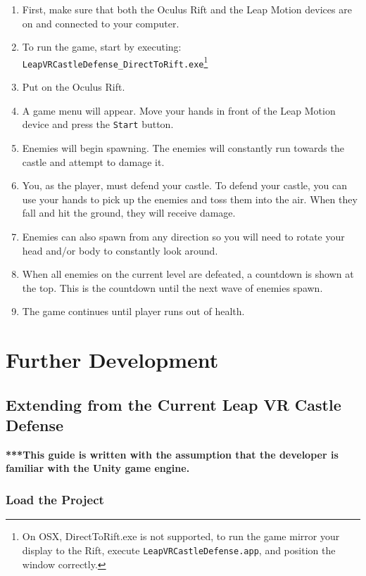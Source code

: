 \documentclass[a4paper]{refart}
\begin{document}
\begin{enumerate}
	\item First, make sure that both the Oculus Rift and the Leap Motion devices are on and connected to your computer.
	\item To run the game, start by executing:\\
		 \texttt{LeapVRCastleDefense\_DirectToRift.exe}\footnote{On OSX, DirectToRift.exe is not supported, to run the game mirror your display to the Rift, execute \texttt{LeapVRCastleDefense.app}, and position the window correctly.}
	\item Put on the Oculus Rift.
	\item A game menu will appear. Move your hands in front of the Leap Motion device and press the \texttt{Start} button.
	\item Enemies will begin spawning. The enemies will constantly run towards the castle and attempt to damage it. 
	\item You, as the player, must defend your castle. To defend your castle, you can use your hands to pick up the enemies and toss them into the air. When they fall and hit the ground, they will receive damage. 
	\item Enemies can also spawn from any direction so you will need to rotate your head and/or body to constantly look around.
	\item When all enemies on the current level are defeated, a countdown is shown at the top. This is the countdown until the next wave of enemies spawn. 
	\item The game continues until player runs out of health.
\end{enumerate}

\newpage

\section{Further Development}

\subsection{Extending from the Current Leap VR Castle Defense}

\textbf{***This guide is written with the assumption that the developer is familiar with the Unity game engine.}

\subsubsection{Load the Project}
\end{document}
